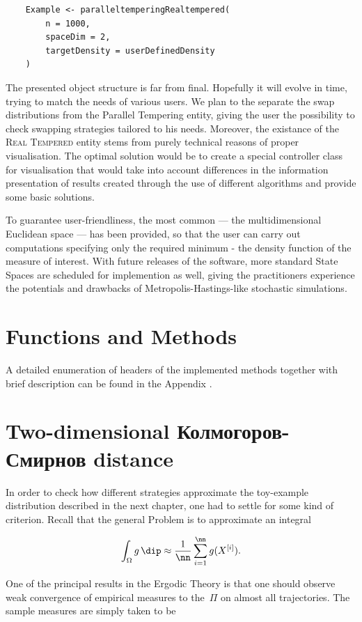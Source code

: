 \begin{lstlisting}
	Example <- paralleltemperingRealtempered(
		n = 1000,
		spaceDim = 2,
		targetDensity = userDefinedDensity
	)
\end{lstlisting}

The presented object structure is far from final. Hopefully it will evolve in time, trying to match the needs of various users. We plan to the separate the swap distributions from the Parallel Tempering entity, giving the user the possibility to check swapping strategies tailored to his needs. Moreover, the existance of the \textsc{Real Tempered} entity stems from purely technical reasons of proper visualisation. The optimal solution would be to create a special controller class for visualisation that would take into account differences in the information presentation of results created through the use of different algorithms and provide some basic solutions.

To guarantee user-friendliness, the most common \sspace --- the multidimensional Euclidean space --- has been provided, so that the user can carry out computations specifying only the required minimum - the density function of the measure of interest. With future releases of the software, more standard State Spaces are scheduled for implemention as well, giving the practitioners experience the potentials and drawbacks of Metropolis-Hastings-like stochastic simulations.

\section{Functions and Methods}

A detailed enumeration of headers of the implemented methods together with brief description can be found in the Appendix .

\section{Two-dimensional Колмогоров-Смирнов distance}

In order to check how different strategies approximate the toy-example distribution described in the next chapter, one had to settle for some kind of criterion. Recall that the general Problem is to approximate an integral

$$\int_\Omega g \,\dip \approx \frac{1}{\nn}\sum_{i = 1}^\nn g(X^{[i]}). $$

One of the principal results in the Ergodic Theory is that one should observe weak convergence of empirical measures to the \measure\,$\Pi$ on almost all trajectories. The sample measures are simply taken to be

